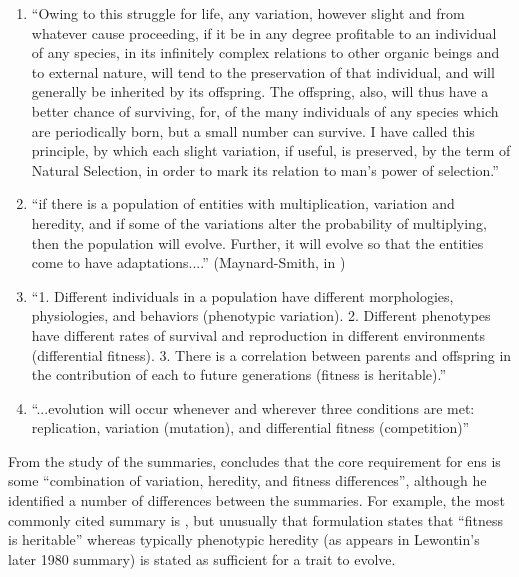 \begin{enumerate}
\item ``Owing to this struggle for life, any variation, however slight and from whatever cause proceeding, if it be in any degree profitable to an individual of any species, in its infinitely complex relations to other organic beings and to external nature, will tend to the preservation of that individual, and will generally be inherited by its offspring. The offspring, also, will thus have a better chance of surviving, for, of the many individuals of any species which are periodically born, but a small number can survive. I have called this principle, by which each slight variation, if useful, is preserved, by the term of Natural Selection, in order to mark its relation to man's power of selection.'' \cite{Darwin1859}

\item ``if there is a population of entities with multiplication, variation and heredity, and if some of the variations alter the probability of multiplying, then the population will evolve. Further, it will evolve so that the entities come to have adaptations....'' (Maynard-Smith, in \cite{Griesemer2001})

\item ``1. Different individuals in a population have different morphologies, physiologies, and behaviors (phenotypic variation). 2. Different phenotypes have different rates of survival and reproduction in different environments (differential fitness). 3. There is a correlation between parents and offspring in the contribution of each to future generations (fitness is heritable).'' \cite{Lewontin:1970mc}

\item ``...evolution will occur whenever and wherever three conditions are met: replication, variation (mutation), and differential fitness (competition)'' \parencite[quoting Daniel Dennett]{Ofria2004}

\end{enumerate}

From the study of the summaries, \cite{Godfrey-Smith2007} concludes that the core requirement for \gls{ens} is some ``combination of variation, heredity, and fitness differences'', although he identified a number of differences between the summaries. For example, the most commonly cited summary is \cite{Lewontin:1970mc}, but unusually that formulation states that ``fitness is heritable'' whereas typically phenotypic heredity (as appears in Lewontin's later 1980 summary) is stated as sufficient for a trait to evolve. 

